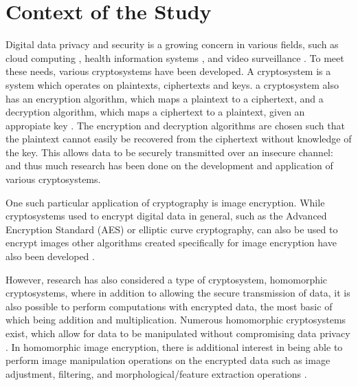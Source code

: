 
\section{Context of the Study}

Digital data privacy and security is a growing concern in various fields, such as  cloud computing \cite{potey_homomorphic_2016}, health information systems \cite{kester_cryptographic_2015}, and video surveillance \cite{upmanyu_efficient_2009}. To meet these needs, various cryptosystems have been developed. A cryptosystem is a system which operates on plaintexts, ciphertexts and keys. a cryptosystem also has an encryption algorithm, which maps a plaintext to a ciphertext, and a decryption algorithm, which maps a ciphertext to a plaintext, given an appropiate key \cite{bauer_cryptosystem_2005}. The encryption and decryption algorithms are chosen such that the plaintext cannot easily be recovered from the ciphertext without knowledge of the key. This allows data to be securely transmitted over an insecure channel:  and thus much research has been done on the development and application of various cryptosystems.

One such particular application of cryptography is image encryption. While cryptosystems used to encrypt digital data in general, such as the Advanced Encryption Standard (AES) or elliptic curve cryptography, can also be used to encrypt images \cite{jain_image_2016, singh_image_2015} other algorithms created specifically for image encryption have also been developed \cite{murugan_survey_2018}.

However, research has also considered a type of cryptosystem, homomorphic cryptosystems, where in addition to allowing the secure transmission of data, it is also possible to perform computations with encrypted data, the most basic of which being addition and multiplication. Numerous homomorphic cryptosystems exist, which allow for data to be manipulated without compromising data privacy \cite{fontaine_survey_2007, sen_homomorphic_2013}. In homomorphic image encryption, there is additional interest in being able to perform image manipulation operations on the encrypted data such as image adjustment, filtering, and morphological/feature extraction operations \cite{ziad_cryptoimg:_2016, gonzalez_digital_2008}.
